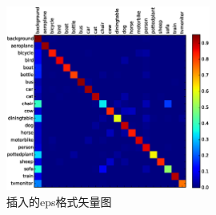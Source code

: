 \begin{figure}[h]
	\centering
	\includegraphics[width=0.6\textwidth]{image/chap03/confusion.eps}
	\caption{插入的eps格式矢量图}
	\label{fig:confusion}
\end{figure}